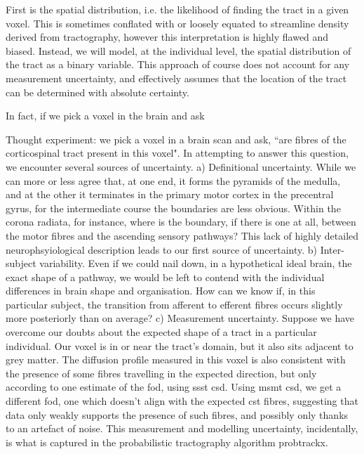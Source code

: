 First is the spatial distribution, i.e. the likelihood of finding the tract in a given voxel.
This is sometimes conflated with or loosely equated to streamline density derived from tractography, however this interpretation is highly flawed and biased.
Instead, we will model, at the individual level, the spatial distribution of the tract as a binary variable.
This approach of course does not account for any measurement uncertainty, and effectively assumes that the location of the tract can be determined with absolute certainty.

In fact, if we pick a voxel in the brain and ask

Thought experiment: we pick a voxel in a brain scan and ask, ``are fibres of the corticospinal tract present in this voxel".
In attempting to answer this question, we encounter several sources of uncertainty.
a) Definitional uncertainty.
While we can more or less agree that, at one end, it forms the pyramids of the medulla, and at the other it terminates in the primary motor cortex in the precentral gyrus, for the intermediate course the boundaries are less obvious.
Within the corona radiata, for instance, where is the boundary, if there is one at all, between the motor fibres and the ascending sensory pathways?
This lack of highly detailed neurophsyiological description leads to our first source of uncertainty.
b) Inter-subject variability.
Even if we could nail down, in a hypothetical ideal brain, the exact shape of a pathway, we would be left to contend with the individual differences in brain shape and organisation.
How can we know if, in this particular subject, the transition from afferent to efferent fibres occurs slightly more posteriorly than on average?
c) Measurement uncertainty.
Suppose we have overcome our doubts about the expected shape of a tract in a particular individual.
Our voxel is in or near the tract's domain, but it also sits adjacent to grey matter.
The diffusion profile measured in this voxel is also consistent with the presence of some fibres travelling in the expected direction, but only according to one estimate of the \gls{fod}, using \gls{ssst} \gls{csd}.
Using \gls{msmt} \gls{csd}, we get a different \gls{fod}, one which doesn't align with the expected \gls{cst} fibres, suggesting that data only weakly supports the presence of such fibres, and possibly only thanks to an artefact of noise.
This measurement and modelling uncertainty, incidentally, is what is captured in the probabilistic tractography algorithm probtrackx.\autocite{Behrens2007}

